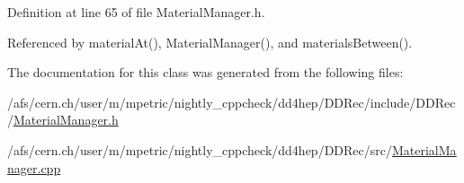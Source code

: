 Definition at line 65 of file MaterialManager.h.

Referenced by materialAt(), MaterialManager(), and materialsBetween().

The documentation for this class was generated from the following files:\begin{DoxyCompactItemize}
\item 
/afs/cern.ch/user/m/mpetric/nightly\_\-cppcheck/dd4hep/DDRec/include/DDRec/\hyperlink{_material_manager_8h}{MaterialManager.h}\item 
/afs/cern.ch/user/m/mpetric/nightly\_\-cppcheck/dd4hep/DDRec/src/\hyperlink{_material_manager_8cpp}{MaterialManager.cpp}\end{DoxyCompactItemize}
